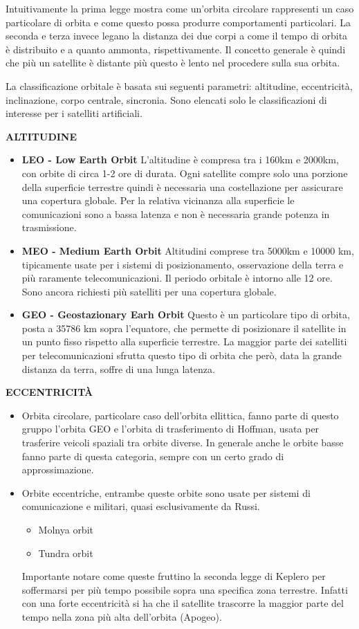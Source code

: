 \documentclass[a4paper]{article}
\begin{document}
			Intuitivamente la prima legge mostra come un'orbita circolare rappresenti un caso particolare di orbita e  come questo possa produrre comportamenti particolari. La seconda e terza invece legano la distanza dei due corpi a come il tempo di orbita è distribuito e a quanto ammonta, rispettivamente. Il concetto generale è quindi che più un satellite è distante più questo è lento nel procedere sulla sua orbita.
			
			La classificazione orbitale è basata sui seguenti parametri: altitudine, eccentricità, inclinazione, corpo centrale, sincronia. Sono elencati solo le classificazioni di interesse per i satelliti artificiali.
						
			{\large \bf ALTITUDINE}
			\begin{itemize}
				\item {\bf LEO - Low Earth Orbit}
				L'altitudine è compresa tra i 160km e 2000km, con orbite di circa 1-2 ore di durata. Ogni satellite compre solo una porzione della superficie terrestre quindi è necessaria una costellazione per assicurare una copertura globale. Per la relativa vicinanza alla superficie le comunicazioni sono a bassa latenza e non è necessaria grande potenza in trasmissione.
				\item {\bf MEO - Medium Earth Orbit}
				Altitudini comprese tra 5000km e 10000 km, tipicamente usate per i sistemi di posizionamento, osservazione della terra e più raramente telecomunicazioni. Il periodo orbitale è intorno alle 12 ore. Sono ancora richiesti più satelliti per una copertura globale.				
				\item {\bf GEO - Geostazionary Earh Orbit}
				Questo è un particolare tipo di orbita, posta a 35786 km sopra l'equatore, che permette di posizionare il satellite in un punto fisso rispetto alla superficie terrestre. La maggior parte dei satelliti per telecomunicazioni sfrutta questo tipo di orbita che però, data la grande distanza da terra, soffre di una lunga latenza.
			\end{itemize}
			
			{\large \bf ECCENTRICITÀ}	
			\begin{itemize}
				\item Orbita circolare, particolare caso dell'orbita ellittica, fanno parte di questo gruppo l'orbita GEO e l'orbita di trasferimento di Hoffman, usata per trasferire veicoli spaziali tra orbite diverse. In generale anche le orbite basse fanno parte di questa categoria, sempre con un certo grado di approssimazione.
				\item Orbite eccentriche, entrambe queste orbite sono usate per sistemi di comunicazione e militari, quasi esclusivamente da Russi. \begin{itemize}
					\item Molnya orbit
					\item Tundra orbit					
				\end{itemize}
				Importante notare come queste fruttino la seconda legge di Keplero per soffermarsi per più tempo possibile sopra una specifica zona terrestre. Infatti con una forte eccentricità si ha che il satellite trascorre la maggior parte del tempo nella zona più alta dell'orbita (Apogeo). 								
			\end{itemize}
			
\end{document}
